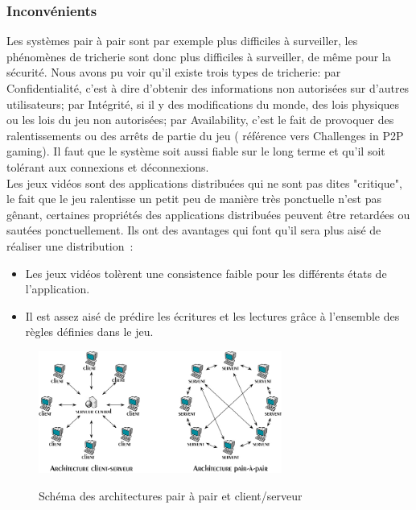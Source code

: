 		\subsubsection{Inconvénients}
	Les systèmes pair à pair sont par exemple plus difficiles à surveiller, les phénomènes de tricherie sont donc plus difficiles à surveiller, de même pour la sécurité. Nous avons pu voir qu'il existe trois types de tricherie: par Confidentialité, c'est à dire d'obtenir des informations non autorisées sur d'autres utilisateurs; par Intégrité, si il y des modifications du monde, des lois physiques ou les lois du jeu non autorisées; par Availability, c'est le fait de provoquer des ralentissements ou des arrêts de partie du jeu ( référence vers Challenges in P2P gaming). Il faut que le système soit aussi fiable sur le long terme et qu'il soit tolérant aux connexions et déconnexions.\\
	Les jeux vidéos sont des applications distribuées qui ne sont pas dites "critique", le fait que le jeu ralentisse un petit peu de manière très ponctuelle n'est pas gênant, certaines propriétés des applications distribuées peuvent être retardées ou sautées ponctuellement. Ils ont des avantages qui font qu'il sera plus aisé de réaliser une distribution~\cite{1267692}:
	\begin{itemize}
		\renewcommand{\labelitemi}{$\bullet$}
		\item Les jeux vidéos tolèrent une consistence faible pour les différents états de l'application.
		\item Il est assez aisé de prédire les écritures et les lectures grâce à l'ensemble des règles définies dans le jeu. 
	\end{itemize}
	\vspace{1cm}
	\begin{figure}[!h]
	\centering
	\includegraphics[width=8cm,height=4cm]{../Images/p2p-85145.png}\\
	\caption{Schéma des architectures pair à pair et client/serveur}
	\label{P2P/ClServ}
	\end{figure} 
\newpage

